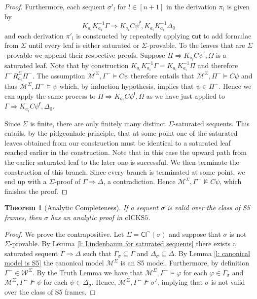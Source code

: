 \documentclass{myifcolog}
\newcommand\C {C}
\newcommand{\K}{K}
\newcommand\Cl {\mathsf{Cl}}
\newcommand{\agi}{a}
\newcommand{\fw}{\mathcal{M}}
\newcommand{\f}{\mathsf{f}}
\newcommand{\W}{\mathcal{W}}
\newcommand{\cickss}{\mathrm{cICKS5}}
\newtheorem{theorem}{Theorem}
\numberwithin{theorem}{section}
\begin{document}
\begin{proof}
		    Furthermore, each sequent $\sigma'_l$ for $ l \in [n+1]$ in the derivation $\pi_i$ is given by
			\[
			  \K_{\agi_i} \K_{\agi_i}^{-1} \Gamma \Rightarrow \K_{\agi_l} \C \psi^\f, \K_{\agi_i} \K_{\agi_i}^{-1} \Delta_0
			\]
			and each derivation $\pi'_l$ is constructed by repeatedly applying $\mathsf{cut}$ to add formulae from $\Sigma$ until every leaf is either saturated or $\Sigma$-provable. To the leaves that are $\Sigma$-provable we append their respective proofs. Suppose $\Pi \Rightarrow \K_{\agi_l} \C \psi^\f, \Omega$ is a saturated leaf. Note that by construction $\K_{\agi_i} \K_{\agi_i}^{-1} \Gamma = \K_{\agi_i} \K_{\agi_i}^{-1} \Pi$ and therefore $\Gamma^- \mathrel{R_{\agi_i}^\Sigma} \Pi^-$. The assumption $\fw^\Sigma, \Gamma^- \models \C \psi$ therefore entails that $\fw^\Sigma, \Pi^- \models \C \psi$ and thus $\fw^\Sigma, \Pi^- \models \psi$ which, by induction hypothesis, implies that $\psi \in \Pi^-$. Hence we can apply the same process to $\Pi \Rightarrow \K_{\agi_l} \C \psi^\f, \Omega$ as we have just applied to $\Gamma \Rightarrow \K_{\agi_i} \C \psi^\f, \Delta_0$. \smallskip
			
			Since $\Sigma$ is finite, there are only finitely many distinct $\Sigma$-saturated sequents. This entails, by the pidgeonhole principle, that at some point one of the saturated leaves obtained from our construction must be identical to a saturated leaf reached earlier in the construction. Note that in this case the upward path from the earlier saturated leaf to the later one is successful. We then terminate the construction of this branch. Since every branch is terminated at some point, we end up with a $\Sigma$-proof of $\Gamma \Rightarrow \Delta$, a contradiction. Hence $\fw^\Sigma, \Gamma^- \not \models \C \psi$, which finishes the proof.
\end{proof}


\begin{theorem}[Analytic Completeness]\label{t: completeness of S5}
     If a sequent $\sigma$ is valid over the class of S5 frames, then $\sigma$ has an analytic proof in $\cickss$.
\end{theorem}
\begin{proof}
    We prove the contrapositive. Let $\Sigma = \Cl^\neg(\sigma)$ and suppose that $\sigma $ is not $\Sigma$-provable. By Lemma \ref{l: Lindenbaum for saturated sequents} there exists a saturated sequent $\Gamma \Rightarrow \Delta$ such that $\Gamma_\sigma \subseteq \Gamma$ and $\Delta_\sigma \subseteq \Delta$. By Lemma \ref{l: canonical model is S5} the canonical model $\fw^{\Sigma}$ is an S5 model. Furthermore, by definition $\Gamma^- \in \W^\Sigma$. By the Truth Lemma we have that $\fw^\Sigma, \Gamma^- \models \varphi$ for each $\varphi \in \Gamma_\sigma$ and $\fw^\Sigma, \Gamma^- \not \models \psi$ for each $\psi \in \Delta_\sigma$. Hence, $\fw^\Sigma, \Gamma^- \not \models \sigma^I$, implying that $\sigma$ is not valid over the class of S5 frames.
\end{proof}
\end{document}
